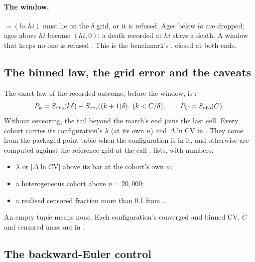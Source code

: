 \paragraph{The window.}  $=(lo,hi)$ must lie on the $\delta$ grid, or it is refused. Ages below
$lo$ are dropped; ages above $hi$ become $(hi,0)$; a death recorded at $hi$ stays a death. A window that keeps no
one is refused . This is the benchmark's , closed at both
ends.

\subsection{The binned law, the grid error and the caveats}\label{sec:gen-err}

The exact law of the recorded outcome, before the window, is :
\begin{equation}
  P_k=S_{\rm obs}(k\delta)-S_{\rm obs}((k+1)\delta)\ \ (k<C/\delta),\qquad P_C=S_{\rm obs}(C).
\end{equation}
Without censoring, the tail beyond the march's end joins the last cell. Every cohort carries its configuration's
$\lambda$ (at its own $n$) and $\Delta\ln\mathrm{CV}$ in . They come from the packaged point table
when the configuration is in it, and otherwise are computed against the reference grid at the call
.  lists, with numbers:
\begin{itemize}[nosep]
  \item $\lambda$ or $|\Delta\ln\mathrm{CV}|$ above its bar at the cohort's own $n$;
  \item a heterogeneous cohort above $n=20{,}000$;
  \item a realised censored fraction more than 0.1 from .
\end{itemize}
An empty tuple means none. Each configuration's converged and binned CV, $C$ and censored mass are in
.

\subsection{The backward-Euler control}\label{sec:gen-be}

